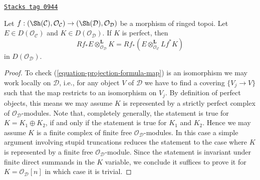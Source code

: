 \begin{lemma}
\label{sites-cohomology-lemma-projection-formula}
\href{https://stacks.math.columbia.edu/tag/0944}{\texttt{Stacks tag 0944}}

Let $f : (\Sh(\mathcal{C}), \mathcal{O}_\mathcal{C}) \to
(\Sh(\mathcal{D}), \mathcal{O}_\mathcal{D})$ be a morphism of ringed topoi.
Let $E \in D(\mathcal{O}_\mathcal{C})$ and $K \in D(\mathcal{O}_\mathcal{D})$.
If $K$ is perfect, then
$$
Rf_*E \otimes^\mathbf{L}_{\mathcal{O}_\mathcal{D}} K =
Rf_*(E \otimes^\mathbf{L}_{\mathcal{O}_\mathcal{C}} Lf^*K)
$$
in $D(\mathcal{O}_\mathcal{D})$.
\end{lemma}

\begin{proof}
To check (\ref{equation-projection-formula-map}) is an isomorphism
we may work locally on $\mathcal{D}$, i.e.,
for any object $V$ of $\mathcal{D}$ we have to find a covering $\{V_j \to V\}$
such that the map restricts to an isomorphism on $V_j$. By definition
of perfect objects, this means we may assume $K$ is represented by
a strictly perfect complex of $\mathcal{O}_\mathcal{D}$-modules.
Note that, completely generally, the statement is true for
$K = K_1 \oplus K_2$, if and only if the statement is true for
$K_1$ and $K_2$. Hence we may assume $K$ is a finite
complex of finite free $\mathcal{O}_\mathcal{D}$-modules.
In this case a simple argument involving stupid truncations reduces
the statement to the case where $K$ is represented by a finite
free $\mathcal{O}_\mathcal{D}$-module. Since the statement is invariant
under finite direct summands in the $K$ variable, we conclude
it suffices to prove it for $K = \mathcal{O}_\mathcal{D}[n]$
in which case it is trivial.
\end{proof}

